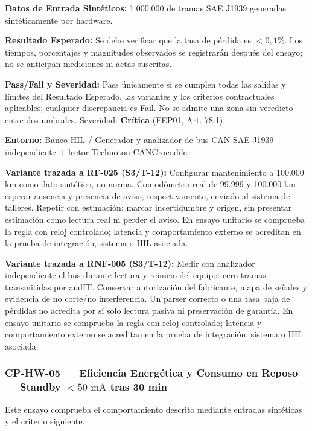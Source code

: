 \par\noindent \textbf{Datos de Entrada Sintéticos:} 1.000.000 de tramas SAE J1939 generadas sintéticamente por hardware.\par
\par\noindent \textbf{Resultado Esperado:} Se debe verificar que la tasa de pérdida es $< 0{,}1\%$. Los tiempos, porcentajes y magnitudes observados se registrarán después del ensayo; no se anticipan mediciones ni actas suscritas.\par
\par\noindent \textbf{Pass/Fail y Severidad:} Pass únicamente si se cumplen todas las salidas y límites del Resultado Esperado, las variantes y los criterios contractuales aplicables; cualquier discrepancia es Fail. No se admite una zona sin veredicto entre dos umbrales. Severidad: \textbf{Crítica} (FEP01, Art. 78.1).\par
\par\noindent \textbf{Entorno:} Banco HIL / Generador y analizador de bus CAN SAE J1939 independiente + lector Technoton CANCrocodile.\par

\par\noindent \textbf{Variante trazada a RF-025 (S3/T-12):} Configurar mantenimiento a 100.000 km como dato sintético, no norma. Con odómetro real de 99.999 y 100.000 km esperar ausencia y presencia de aviso, respectivamente, enviado al sistema de talleres. Repetir con estimación: marcar incertidumbre y origen, sin presentar estimación como lectura real ni perder el aviso. En ensayo unitario se comprueba la regla con reloj controlado; latencia y comportamiento externo se acreditan en la prueba de integración, sistema o HIL asociada.\par

\par\noindent \textbf{Variante trazada a RNF-005 (S3/T-12):} Medir con analizador independiente el bus durante lectura y reinicio del equipo: cero tramas transmitidas por audIT. Conservar autorización del fabricante, mapa de señales y evidencia de no corte/no interferencia. Un parser correcto o una tasa baja de pérdidas no acredita por sí solo lectura pasiva ni preservación de garantía. En ensayo unitario se comprueba la regla con reloj controlado; latencia y comportamiento externo se acreditan en la prueba de integración, sistema o HIL asociada.\par


\subsubsection*{CP-HW-05 — Eficiencia Energética y Consumo en Reposo — Standby $< 50\text{ mA}$ tras 30 min}\label{sec:9-cp-hw-05}
Este ensayo comprueba el comportamiento descrito mediante entradas sintéticas y el criterio siguiente.

